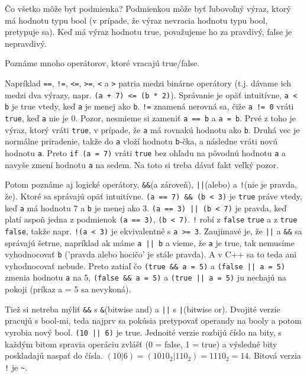 \medskip

Čo všetko môže byť podmienka? Podmienkou môže byť ľubovoľný výraz, ktorý má
hodnotu typu bool (v prípade, že výraz nevracia hodnotu typu bool, pretypuje sa).  Keď má výraz
hodnotu true, považujeme ho za pravdivý, false je nepravdivý.

Poznáme mnoho operátorov, ktoré vracajú true/false. 

Napríklad \verb'==', \verb'!=', \verb'<=', \verb'>=', \verb'<' a \verb'>' patria medzi binárne
operátory (t.j. dávame ich medzi dva výrazy, napr. \verb!(a + 7) <= (b * 2)!).
Správanie je opäť intuitívne, \verb'a < b' je true vtedy, keď \verb!a! je menej ako
\verb!b!.  \verb'!=' znamená nerovná sa, čiže \verb'a != 0' vráti \verb!true!, keď
\verb!a! nie je 0. Pozor, nesmieme si zameniť \verb'a == b' a \verb'a = b'.  Prvé z
toho je výraz, ktorý vráti \verb!true!, v prípade, že \verb!a! má rovnakú hodnotu
ako \verb!b!. Druhá vec je normálne priradenie, takže do \verb!a! vloží hodnotu \verb!b!-čka,
a následne vráti novú hodnotu \verb!a!. Preto \verb!if (a = 7)! vráti \verb!true!
bez ohľadu na pôvodnú hodnotu \verb!a! a navyše zmení hodnotu \verb!a! na sedem.  Na toto
si treba dávať fakt veľký pozor. 

Potom poznáme aj logické operátory, \verb!&&!(a zároveň), \verb!||!(alebo) a
\verb'!'(nie je pravda, že). Ktoré sa správajú opäť intuitívne.  
\verb!(a == 7) && (b < 3)! je \verb!true! práve vtedy, keď \verb!a! má hodnotu 7 a
\verb!b! je menej ako 3. \verb!(a == 3) || (b < 7)! je pravda, keď platí aspoň jedna
z podmienok \verb!(a == 3)!, \verb!(b < 7)!. \verb'!' robí z 
\verb!false! \verb!true! a z \verb!true! \verb!false!, takže napr. \verb'!(a < 3)' je
ekvivalentné s \verb'a >= 3'.  Zaujímavé je, že \verb!||! a \verb!&&! sa
správajú šetrne, napríklad ak máme \verb!a || b! a vieme, že \verb!a! je true, tak
nemusíme vyhodnocovať \verb!b! ('pravda alebo hocičo' je stále pravda). A v C++ sa
to teda ani vyhodnocovať nebude.  Preto zatiaľ čo \verb!(true && a = 5)! a
\verb!(false || a = 5)!  zmenia hodnotu \verb!a! na 5, \verb!(false && a = 5)! a
\verb!(true || a = 5)! ju nechajú na pokoji (príkaz a = 5 sa nevykoná).

\medskip

Tiež si netreba mýliť \verb!&&! s \verb!&!(bitwise and) a \verb!||! s
\verb!|!(bitwise or). Dvojité verzie pracujú s bool-mi, teda najprv sa pokúsia
pretypovať operandy na booly a potom vyrobia nový bool. \verb!(10 || 6)! je true.
Jednoité verzie rozbijú číslo na bity, s každým bitom spravia operáciu zvlášť
(0 = false, 1 = true) a výsledné bity poskladajú naspať do čísla. 
$(10 | 6) = (1010_2 | 110_2) = 1110_2 = 14$.  Bitová verzia 
\verb'!' je \verb'~'.

